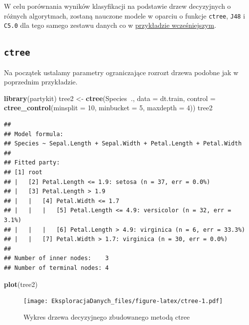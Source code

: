 \documentclass[]{book}
\newenvironment{Shaded}{\begin{snugshade}}{\end{snugshade}}
\newcommand{\DataTypeTok}[1]{\textcolor[rgb]{0.13,0.29,0.53}{#1}}
\newcommand{\DecValTok}[1]{\textcolor[rgb]{0.00,0.00,0.81}{#1}}
\newcommand{\KeywordTok}[1]{\textcolor[rgb]{0.13,0.29,0.53}{\textbf{#1}}}
\newcommand{\NormalTok}[1]{#1}
\newcommand{\OperatorTok}[1]{\textcolor[rgb]{0.81,0.36,0.00}{\textbf{#1}}}
\newcommand{\StringTok}[1]{\textcolor[rgb]{0.31,0.60,0.02}{#1}}
\theoremstyle{plain}
\theoremstyle{definition}
\begin{document}
W celu porównania wyników klasyfikacji na podstawie drzew decyzyjnych o różnych algorytmach, zostaną nauczone modele w oparciu o funkcje \texttt{ctree}, \texttt{J48} i \texttt{C5.0} dla tego samego zestawu danych co w \protect\hyperlink{przyk41}{przykładzie wcześniejszym}.

\hypertarget{ctree}{%
\subsection{\texorpdfstring{\texttt{ctree}}{ctree}}\label{ctree}}

Na początek ustalamy parametry ograniczające rozrozt drzewa podobne jak w poprzednim przykładzie.

\begin{Shaded}
\begin{Highlighting}[]
\KeywordTok{library}\NormalTok{(partykit)}
\NormalTok{tree2 <-}\StringTok{ }\KeywordTok{ctree}\NormalTok{(Species}\OperatorTok{~}\NormalTok{., }\DataTypeTok{data =}\NormalTok{ dt.train,}
               \DataTypeTok{control =} \KeywordTok{ctree_control}\NormalTok{(}\DataTypeTok{minsplit =} \DecValTok{10}\NormalTok{,}
                                       \DataTypeTok{minbucket =} \DecValTok{5}\NormalTok{,}
                                       \DataTypeTok{maxdepth =} \DecValTok{4}\NormalTok{))}
\NormalTok{tree2}
\end{Highlighting}
\end{Shaded}

\begin{verbatim}
## 
## Model formula:
## Species ~ Sepal.Length + Sepal.Width + Petal.Length + Petal.Width
## 
## Fitted party:
## [1] root
## |   [2] Petal.Length <= 1.9: setosa (n = 37, err = 0.0%)
## |   [3] Petal.Length > 1.9
## |   |   [4] Petal.Width <= 1.7
## |   |   |   [5] Petal.Length <= 4.9: versicolor (n = 32, err = 3.1%)
## |   |   |   [6] Petal.Length > 4.9: virginica (n = 6, err = 33.3%)
## |   |   [7] Petal.Width > 1.7: virginica (n = 30, err = 0.0%)
## 
## Number of inner nodes:    3
## Number of terminal nodes: 4
\end{verbatim}

\begin{Shaded}
\begin{Highlighting}[]
\KeywordTok{plot}\NormalTok{(tree2)}
\end{Highlighting}
\end{Shaded}

\begin{figure}
\centering
\texttt{[image: EksploracjaDanych\_files/figure-latex/ctree-1.pdf]}
\caption{\label{fig:ctree}Wykres drzewa decyzyjnego zbudowanego metodą ctree}
\end{figure}
\end{document}
